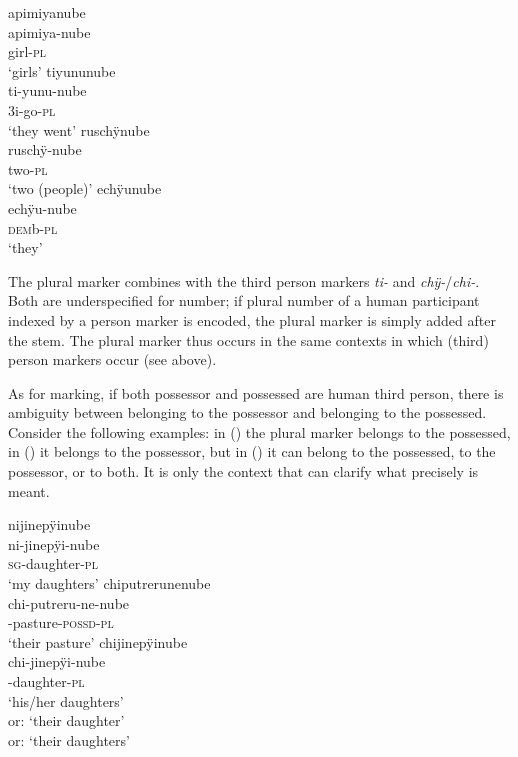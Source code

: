 \ea\label{ex:FirstPlural-1}
  \ea
\begingl
\glpreamble apimiyanube\\
\gla apimiya-nube\\
\glb girl-\textsc{pl}\\
\glft ‘girls’
\endgl
  \ex
\begingl
\glpreamble tiyununube\\
\gla ti-yunu-nube\\
\glb 3i-go-\textsc{pl}\\
\glft ‘they went’
\endgl
  \ex
\begingl
\glpreamble ruschÿnube\\
\gla ruschÿ-nube\\
\glb two-\textsc{pl}\\
\glft ‘two (people)’
\endgl
  \ex
\begingl
\glpreamble echÿunube\\
\gla echÿu-nube\\
\glb \textsc{dem}b-\textsc{pl}\\
\glft ‘they’
\endgl
\z
\xe

The plural marker combines with the third person markers \textit{ti-} and \textit{chÿ-}/\textit{chi-}. Both are underspecified for number; if plural number of a human participant indexed by a person marker is encoded, the plural marker is simply added after the stem. The plural marker thus occurs in the same contexts in which (third) person markers occur (see  above). 

As for  marking, if both possessor and possessed are human third person, there is ambiguity between belonging to the possessor and belonging to the possessed. Consider the following examples: in () the plural marker belongs to the possessed, in () it belongs to the possessor, but in () it can belong to the possessed, to the possessor, or to both. It is only the context that can clarify what precisely is meant.

\ea\label{ex:FirstPlural-2}
  \ea\label{ex:FirstPlural-2.1}
\begingl
\glpreamble nijinepÿinube\\
\gla ni-jinepÿi-nube\\
\textsc{sg}-daughter-\textsc{pl}\\
\glft ‘my daughters’
\endgl
  \ex\label{ex:FirstPlural-2.2}
\begingl
\glpreamble chiputrerunenube\\
\gla chi-putreru-ne-nube\\
-pasture-\textsc{possd}-\textsc{pl}\\
\glft ‘their pasture’
\endgl
  \ex\label{ex:FirstPlural-2.3}
\begingl
\glpreamble chijinepÿinube\\
\gla chi-jinepÿi-nube\\
-daughter-\textsc{pl}\\
\glft ‘his/her daughters’\\or: ‘their daughter’\\or: ‘their daughters’
\endgl
\z
\xe

